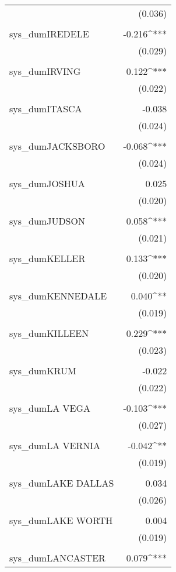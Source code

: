 \begin{table}[!htbp]
\begin{tabular}{@{\extracolsep{5pt}}lD{.}{.}{-3} }
  & (0.036) \\ 
  & \\ 
 sys\_dumIREDELE & -0.216^{***} \\ 
  & (0.029) \\ 
  & \\ 
 sys\_dumIRVING & 0.122^{***} \\ 
  & (0.022) \\ 
  & \\ 
 sys\_dumITASCA & -0.038 \\ 
  & (0.024) \\ 
  & \\ 
 sys\_dumJACKSBORO & -0.068^{***} \\ 
  & (0.024) \\ 
  & \\ 
 sys\_dumJOSHUA & 0.025 \\ 
  & (0.020) \\ 
  & \\ 
 sys\_dumJUDSON & 0.058^{***} \\ 
  & (0.021) \\ 
  & \\ 
 sys\_dumKELLER & 0.133^{***} \\ 
  & (0.020) \\ 
  & \\ 
 sys\_dumKENNEDALE & 0.040^{**} \\ 
  & (0.019) \\ 
  & \\ 
 sys\_dumKILLEEN & 0.229^{***} \\ 
  & (0.023) \\ 
  & \\ 
 sys\_dumKRUM & -0.022 \\ 
  & (0.022) \\ 
  & \\ 
 sys\_dumLA VEGA & -0.103^{***} \\ 
  & (0.027) \\ 
  & \\ 
 sys\_dumLA VERNIA & -0.042^{**} \\ 
  & (0.019) \\ 
  & \\ 
 sys\_dumLAKE DALLAS & 0.034 \\ 
  & (0.026) \\ 
  & \\ 
 sys\_dumLAKE WORTH & 0.004 \\ 
  & (0.019) \\ 
  & \\ 
 sys\_dumLANCASTER & 0.079^{***} \\ 

\end{tabular}
\end{table}

